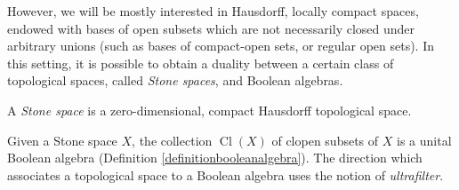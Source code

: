 



However, we will be mostly interested in Hausdorff, locally compact spaces, endowed with bases of open subsets which are not necessarily closed under arbitrary unions (such as bases of compact-open sets, or regular open sets). In this setting, it is possible to obtain a duality between a certain class of topological spaces, called \emph{Stone spaces}, and Boolean algebras.

\begin{definition}\label{definitionstonespace}
A \emph{Stone space} is a zero-dimensional, compact Hausdorff topological space.
\end{definition}

Given a Stone space $X$, the collection $\operatorname{Cl}(X)$ of clopen subsets of $X$ is a unital Boolean algebra (Definition \ref{definitionbooleanalgebra}). The direction which associates a topological space to a Boolean algebra uses the notion of \emph{ultrafilter}.

